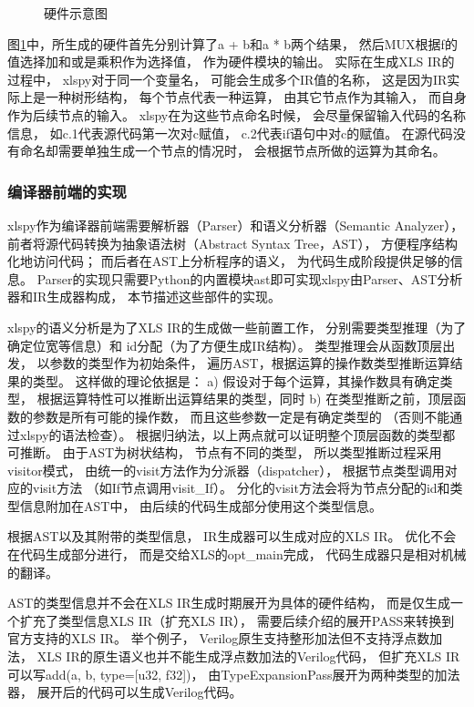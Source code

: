 \begin{figure}[h]
\centering

\caption{硬件示意图}
\label{fig.1}
\end{figure}

图\ref{fig.1}中，所生成的硬件首先分别计算了a + b和a * b两个结果，
然后MUX根据f的值选择加和或是乘积作为选择值，
作为硬件模块的输出。
实际在生成XLS IR的过程中，
xlspy对于同一个变量名，
可能会生成多个IR值的名称，
这是因为IR实际上是一种树形结构，
每个节点代表一种运算，
由其它节点作为其输入，
而自身作为后续节点的输入。
xlspy在为这些节点命名时候，
会尽量保留输入代码的名称信息，
如c.1代表源代码第一次对c赋值，
c.2代表if语句中对c的赋值。
在源代码没有命名却需要单独生成一个节点的情况时，
会根据节点所做的运算为其命名。

\subsubsection{编译器前端的实现}

xlspy作为编译器前端需要解析器（Parser）和语义分析器（Semantic Analyzer），
前者将源代码转换为抽象语法树（Abstract Syntax Tree，AST），
方便程序结构化地访问代码；
而后者在AST上分析程序的语义，
为代码生成阶段提供足够的信息。
Parser的实现只需要Python的内置模块ast即可实现xlspy由Parser、AST分析器和IR生成器构成，
本节描述这些部件的实现。

xlspy的语义分析是为了XLS IR的生成做一些前置工作，
分别需要类型推理（为了确定位宽等信息）和
id分配（为了方便生成IR结构）。
类型推理会从函数顶层出发，
以参数的类型作为初始条件，
遍历AST，根据运算的操作数类型推断运算结果的类型。
这样做的理论依据是：
a) 假设对于每个运算，其操作数具有确定类型，
根据运算特性可以推断出运算结果的类型，同时
b) 在类型推断之前，顶层函数的参数是所有可能的操作数，
而且这些参数一定是有确定类型的
（否则不能通过xlspy的语法检查）。
根据归纳法，以上两点就可以证明整个顶层函数的类型都可推断。
由于AST为树状结构，
节点有不同的类型，
所以类型推断过程采用visitor模式，
由统一的visit方法作为分派器（dispatcher），
根据节点类型调用对应的visit方法
（如If节点调用visit\_If）。
分化的visit方法会将为节点分配的id和类型信息附加在AST中，
由后续的代码生成部分使用这个类型信息。

根据AST以及其附带的类型信息，
IR生成器可以生成对应的XLS IR。
优化不会在代码生成部分进行，
而是交给XLS的opt\_main完成，
代码生成器只是相对机械的翻译。

AST的类型信息并不会在XLS IR生成时期展开为具体的硬件结构，
而是仅生成一个扩充了类型信息XLS IR（扩充XLS IR），
需要后续介绍的展开PASS来转换到官方支持的XLS IR。
举个例子，
Verilog原生支持整形加法但不支持浮点数加法，
XLS IR的原生语义也并不能生成浮点数加法的Verilog代码，
但扩充XLS IR可以写add(a, b, type=[u32, f32])，
由TypeExpansionPass展开为两种类型的加法器，
展开后的代码可以生成Verilog代码。


